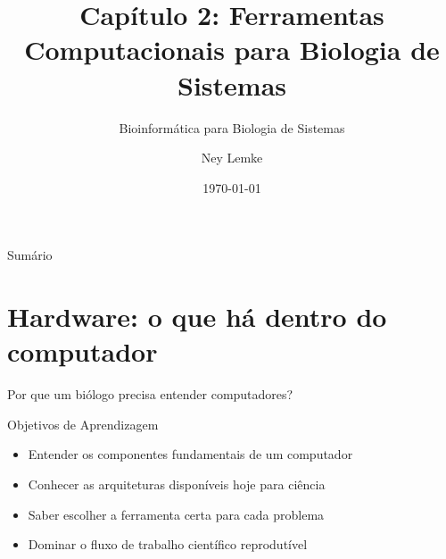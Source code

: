 


\title[Cap. 2: Ferramentas Computacionais]{Capítulo 2: Ferramentas Computacionais para Biologia de Sistemas}
\subtitle{Bioinformática para Biologia de Sistemas}
\author{Ney Lemke}
\date{\today}



\begin{frame}
\titlepage
\end{frame}

\begin{frame}{Sumário}
\tableofcontents
\end{frame}

\section{Hardware: o que há dentro do computador}

\begin{frame}{Por que um biólogo precisa entender computadores?}
\begin{block}{Objetivos de Aprendizagem}
\begin{itemize}
    \item Entender os componentes fundamentais de um computador
    \item Conhecer as arquiteturas disponíveis hoje para ciência
    \item Saber escolher a ferramenta certa para cada problema
    \item Dominar o fluxo de trabalho científico reprodutível
\end{itemize}
\end{block}

\vspace{0.3cm}

\end{frame}

